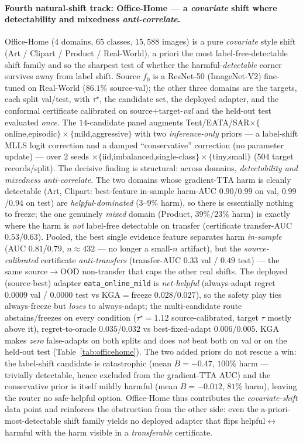 \documentclass[conference]{IEEEtran}
\theoremstyle{plain}
\theoremstyle{definition}
\begin{document}
\paragraph{Fourth natural-shift track: Office-Home --- a \emph{covariate} shift where detectability and mixedness \emph{anti-correlate}.}
Office-Home ($4$ domains, $65$ classes, $15{,}588$ images) is a pure \emph{covariate} style shift
(Art / Clipart / Product / Real-World), a priori the most label-free-detectable shift family and so
the sharpest test of whether the harmful-\emph{detectable} corner survives away from label shift.
Source $f_0$ is a ResNet-50 (ImageNet-V2) fine-tuned on Real-World ($86.1\%$ source-val); the other
three domains are the targets, each split val/test, with $\tau^\star$, the candidate set, the
deployed adapter, and the conformal certificate calibrated on source$+$target-\emph{val} and the
held-out test evaluated \emph{once}. The $14$-candidate panel augments
Tent/EATA/SAR$\times\{$online,episodic$\}\times\{$mild,aggressive$\}$ with two \emph{inference-only}
priors --- a label-shift MLLS logit correction and a damped ``conservative'' correction (no
parameter update) --- over $2$ seeds $\times\{$iid,imbalanced,single-class$\}\times\{$tiny,small$\}$
($504$ target records/split). The decisive finding is structural: across domains, \emph{detectability
and mixedness anti-correlate}. The two domains whose gradient-TTA harm is cleanly detectable (Art,
Clipart: best-feature in-sample harm-AUC $0.90$/$0.99$ on val, $0.99$/$0.94$ on test) are
\emph{helpful-dominated} ($3$--$9\%$ harm), so there is essentially nothing to freeze; the one
genuinely \emph{mixed} domain (Product, $39\%$/$23\%$ harm) is exactly where the harm is \emph{not}
label-free detectable on transfer (certificate transfer-AUC $0.53$/$0.63$). Pooled, the best single
evidence feature separates harm \emph{in-sample} (AUC $0.81$/$0.79$, $n{\approx}432$ --- no longer a
small-$n$ artifact), but the \emph{source-calibrated} certificate \emph{anti-transfers}
(transfer-AUC $0.33$ val / $0.49$ test) --- the same source$\to$OOD non-transfer that caps the other
real shifts. The deployed (source-best) adapter \texttt{eata\_online\_mild} is \emph{net-helpful}
(always-adapt regret $0.0009$ val / $0.0000$ test vs \textsc{KGA}$=$freeze $0.028$/$0.027$), so the
safety play ties always-freeze but \emph{loses} to always-adapt; the multi-candidate route
abstains/freezes on every condition ($\tau^\star{=}1.12$ source-calibrated, target $\tau$ mostly
above it), regret-to-oracle $0.035$/$0.032$ vs best-fixed-adapt $0.006$/$0.005$. \textsc{KGA} makes
\emph{zero} false-adapts on both splits and does \emph{not} beat both on val or on the held-out test
(Table~\ref{tab:officehome}). The two added priors do not rescue a win: the label-shift candidate is
catastrophic (mean $B{=}{-}0.47$, $100\%$ harm --- trivially detectable, hence excluded from the
gradient-TTA AUC) and the conservative prior is itself mildly harmful (mean $B{=}{-}0.012$, $81\%$
harm), leaving the router no safe-helpful option. Office-Home thus contributes the
\emph{covariate-shift} data point and reinforces the obstruction from the other side: even the
a-priori-most-detectable shift family yields no deployed adapter that flips
helpful$\leftrightarrow$harmful with the harm visible in a \emph{transferable} certificate.
\end{document}
